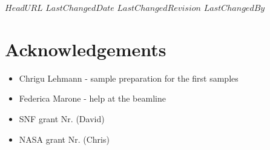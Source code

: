 \svnidlong
{$HeadURL$}
{$LastChangedDate$}
{$LastChangedRevision$}
{$LastChangedBy$}

\section{Acknowledgements}
\begin{itemize}
	\item Chrigu Lehmann - sample preparation for the first samples
	\item Federica Marone - help at the beamline
	\item SNF grant Nr. (David)
	\item NASA grant Nr. (Chris)
\end{itemize}